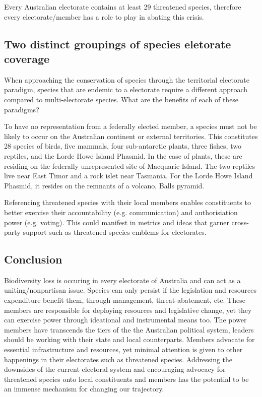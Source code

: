 \documentclass[a4paper,11pt]{article}
\begin{document}
Every Australian electorate contains at least 29 threatened species, therefore every electorate/member has a role to play in abating this crisis.



\subsection{Two distinct groupings of species eletorate coverage}
When approaching the conservation of species through the territorial electorate paradigm, species that are endemic to a electorate require a different approach compared to multi-electorate species.
What are the benefits of each of these paradigms?


To have no representation from a federally elected member, a species must not be likely to occur on the Australian continent or external territories. This constitutes 28 species of birds, five mammals, four sub-antarctic plants, three fishes, two reptiles, and the Lorde Howe Island Phasmid. In the case of plants, these are residing on the federally unrepresented site of Macquarie Island. The two reptiles live near East Timor and a rock islet near Tasmania. For the Lorde Howe Island Phasmid, it resides on the remnants of a volcano, Balls pyramid. 

Referencing threatened species with their local members enables constituents to better exercise their accountability (e.g. communication) and authorisiation power (e.g. voting). This could manifest in metrics and ideas that garner cross-party support such as threatened species emblems for electorates. 

\subsection{Conclusion}

Biodiversity loss is occuring in every electorate of Australia and can act as a uniting/nonpartisan issue. Species can only persist if the legislation and resources expenditure benefit them, through management, threat abatement, etc. These members are responsible for deploying resources and legislative change, yet they can exercise power through ideational and instrumental means too. The power members have transcends the tiers of the the Australian political system, leaders should be working with their state and local counterparts. Members advocate for essential infrastructure and resources, yet minimal attention is given to other happenings in their electorates such as threatened species. Addressing the downsides of the current electoral system and encouraging advocacy for threatened species onto local constituents and members has the potential to be an immense mechanism for changing our trajectory.
\end{document}
